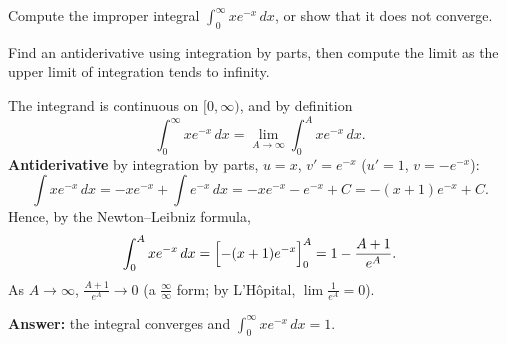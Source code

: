 
\begin{question}
Compute the improper integral $\int_0^\infty xe^{-x}\,dx$, or show that it does not converge.
\end{question}

\begin{hint}
Find an antiderivative using integration by parts, then compute the limit as the upper limit of integration tends to infinity.
\end{hint}

\begin{solution}
The integrand is continuous on $[0, \infty)$, and by definition
\[ \int_0^\infty xe^{-x}\,dx = \lim_{A\to\infty}\int_0^A xe^{-x}\,dx. \]
\textbf{Antiderivative} by integration by parts, $u = x$, $v' = e^{-x}$ ($u' = 1$, $v = -e^{-x}$):
\[ \int xe^{-x}\,dx = -xe^{-x} + \int e^{-x}\,dx = -xe^{-x} - e^{-x} + C = -(x + 1)e^{-x} + C. \]
Hence, by the Newton--Leibniz formula,
\[ \int_0^A xe^{-x}\,dx = \Bigl[-(x + 1)e^{-x}\Bigr]_0^A = 1 - \frac{A + 1}{e^A}. \]
As $A \to \infty$, $\frac{A + 1}{e^A} \to 0$ (a $\frac{\infty}{\infty}$ form; by L'Hôpital, $\lim \frac{1}{e^A} = 0$).

\textbf{Answer:} the integral converges and $\boxed{\int_0^\infty xe^{-x}\,dx = 1}$.
\end{solution}
